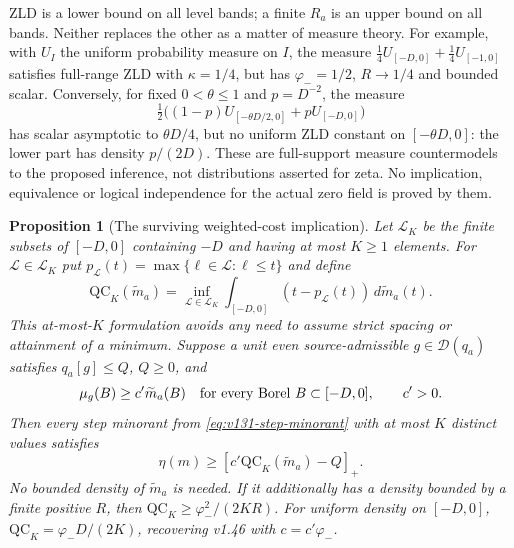 \documentclass[11pt]{article}
\newtheorem{proposition}[theorem]{Proposition}
\theoremstyle{remark}
\begin{document}
ZLD is a lower bound on all level bands; a finite $R_a$ is an upper
bound on all bands. Neither replaces the other as a matter of measure
theory. For example, with $U_I$ the uniform probability measure on
$I$, the measure
$\tfrac14U_{[-D,0]}+\tfrac14U_{[-1,0]}$ satisfies full-range ZLD with
$\kappa=1/4$, but has $\varphi_-=1/2$, $R\to1/4$ and bounded scalar.
Conversely, for fixed $0<\theta\le1$ and $p=D^{-2}$, the measure
\[
 \tfrac12\bigl((1-p)U_{[-\theta D/2,0]}+pU_{[-D,0]}\bigr)
\]
has scalar asymptotic to $\theta D/4$, but no uniform ZLD constant
on $[-\theta D,0]$: the lower part has density $p/(2D)$.
These are full-support measure countermodels to the proposed inference,
not distributions asserted for zeta. No implication, equivalence or
logical independence for the actual zero field is proved by them.

\begin{proposition}[The surviving weighted-cost implication]
\label{prop:v149-weighted-cost}
Let $\mathcal L_K$ be the finite subsets of $[-D,0]$ containing $-D$
and having at most $K\ge1$ elements. For $\mathcal L\in\mathcal L_K$
put $p_{\mathcal L}(t)=\max\{\ell\in\mathcal L:\ell\le t\}$ and define
\begin{equation}\label{eq:v149-qc}
 \mathrm{QC}_K(\widetilde m_a)
 =\inf_{\mathcal L\in\mathcal L_K}
       \int_{[-D,0]}(t-p_{\mathcal L}(t))\,d\widetilde m_a(t).
\end{equation}
This at-most-$K$ formulation avoids any need to assume strict spacing
or attainment of a minimum. Suppose a unit even source-admissible
$g\in\mathcal D(q_a)$ satisfies $q_a[g]\le Q$, $Q\ge0$, and
\begin{equation}\label{eq:v149-wlh}
 \mu_g(B)\ge c'\widetilde m_a(B)
 \quad\hbox{for every Borel }B\subset[-D,0],\qquad c'>0.
\end{equation}
Then every step minorant from \eqref{eq:v131-step-minorant} with at most
$K$ distinct values satisfies
\begin{equation}\label{eq:v149-weighted-cost-bound}
 \eta(m)\ge[c'\mathrm{QC}_K(\widetilde m_a)-Q]_+.
\end{equation}
No bounded density of $\widetilde m_a$ is needed. If it additionally has
a density bounded by a finite positive $R$, then
$\mathrm{QC}_K\ge\varphi_-^2/(2KR)$. For uniform density on $[-D,0]$,
$\mathrm{QC}_K=\varphi_-D/(2K)$, recovering v1.46 with $c=c'\varphi_-$.
\end{proposition}
\end{document}
